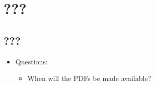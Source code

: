 \documentclass[../notes.tex]{subfiles}
\begin{document}
\chapter{???}
\section{???}
\begin{itemize}
    \item {}Questions:
    \begin{itemize}
        \item When will the PDFs be made available?
    \end{itemize}
\end{itemize}
\end{document}
